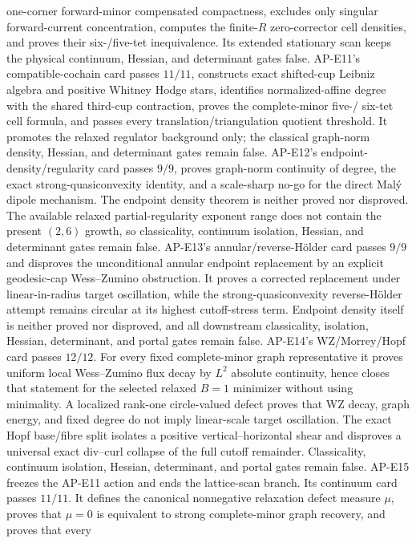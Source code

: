 \documentclass[11pt]{article}
\numberwithin{equation}{section}
\begin{document}
one-corner forward-minor compensated compactness, excludes only singular
forward-current concentration, computes the finite-$R$ zero-corrector cell
densities, and proves their six-/five-tet inequivalence.  Its extended
stationary scan keeps the physical continuum, Hessian, and determinant gates
false.
AP-E11's compatible-cochain card passes $11/11$, constructs exact shifted-cup
Leibniz algebra and positive Whitney Hodge stars, identifies normalized-affine
degree with the shared third-cup contraction, proves the complete-minor five-/
six-tet cell formula, and passes every translation/triangulation quotient
threshold.  It promotes the relaxed regulator background only; the classical
graph-norm density, Hessian, and determinant gates remain false.
AP-E12's endpoint-density/regularity card passes $9/9$, proves graph-norm
continuity of degree, the exact strong-quasiconvexity identity, and a
scale-sharp no-go for the direct Mal\'y dipole mechanism.  The endpoint
density theorem is neither proved nor disproved.  The available relaxed
partial-regularity exponent range does not contain the present $(2,6)$
growth, so classicality, continuum isolation, Hessian, and determinant gates
remain false.
AP-E13's annular/reverse-H\"older card passes $9/9$ and disproves the
unconditional annular endpoint replacement by an explicit geodesic-cap
Wess--Zumino obstruction.  It proves a corrected replacement under
linear-in-radius target oscillation, while the strong-quasiconvexity
reverse-H\"older attempt remains circular at its highest cutoff-stress term.
Endpoint density itself is neither proved nor disproved, and all downstream
classicality, isolation, Hessian, determinant, and portal gates remain false.
AP-E14's WZ/Morrey/Hopf card passes $12/12$.  For every fixed complete-minor
graph representative it proves uniform local Wess--Zumino flux decay by
$L^2$ absolute continuity, hence closes that statement for the selected
relaxed $B=1$ minimizer without using minimality.  A localized rank-one
circle-valued defect proves that WZ decay, graph energy, and fixed degree do
not imply linear-scale target oscillation.  The exact Hopf base/fibre split
isolates a positive vertical--horizontal shear and disproves a universal
exact div--curl collapse of the full cutoff remainder.  Classicality,
continuum isolation, Hessian, determinant, and portal gates remain false.
AP-E15 freezes the AP-E11 action and ends the lattice-scan branch.  Its
continuum card passes $11/11$.  It defines the canonical nonnegative
relaxation defect measure $\mu$, proves that $\mu=0$ is equivalent to strong
complete-minor graph recovery, and proves that every
\end{document}
